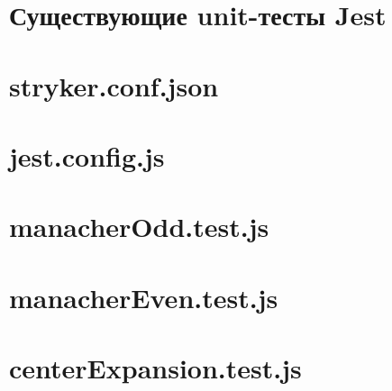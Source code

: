 \section*{Существующие unit-тесты Jest}

\section*{stryker.conf.json}


\section*{jest.config.js}


\section*{manacherOdd.test.js}


\section*{manacherEven.test.js}


\section*{centerExpansion.test.js}


